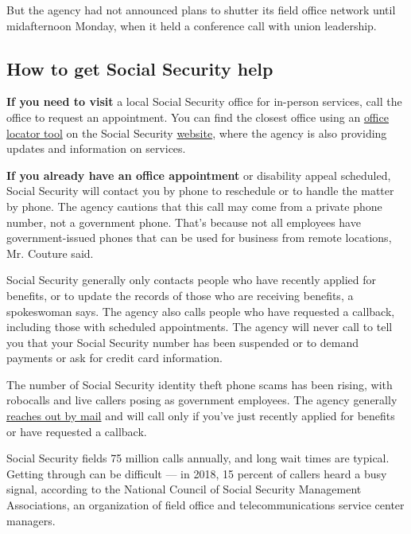 But the agency had not announced plans to shutter its field office
network until midafternoon Monday, when it held a conference call with
union leadership.

\hypertarget{how-to-get-social-security-help}{%
\subsection{How to get Social Security
help}\label{how-to-get-social-security-help}}

\textbf{If you need to visit} a local Social Security office for
in-person services, call the office to request an appointment. You can
find the closest office using an
\href{https://secure.ssa.gov/ICON/main.jsp}{office locator tool} on the
Social Security \href{https://www.ssa.gov/coronavirus/}{website}, where
the agency is also providing updates and information on services.

\textbf{If you already have an office appointment} or disability appeal
scheduled, Social Security will contact you by phone to reschedule or to
handle the matter by phone. The agency cautions that this call may come
from a private phone number, not a government phone. That's because not
all employees have government-issued phones that can be used for
business from remote locations, Mr. Couture said.

Social Security generally only contacts people who have recently applied
for benefits, or to update the records of those who are receiving
benefits, a spokeswoman says. The agency also calls people who have
requested a callback, including those with scheduled appointments. The
agency will never call to tell you that your Social Security number has
been suspended or to demand payments or ask for credit card information.

The number of Social Security identity theft phone scams has been
rising, with robocalls and live callers posing as government employees.
The agency generally
\href{https://faq.ssa.gov/en-US/Topic/article/KA-10018}{reaches out by
mail} and will call only if you've just recently applied for benefits or
have requested a callback.

Social Security fields 75 million calls annually, and long wait times
are typical. Getting through can be difficult --- in 2018, 15 percent of
callers heard a busy signal, according to the National Council of Social
Security Management Associations, an organization of field office and
telecommunications service center managers.

